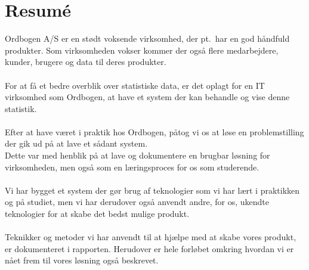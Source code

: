 \section{Resumé}
Ordbogen A/S er en stødt voksende virksomhed, der pt.\ har en god håndfuld produkter. Som virksomheden vokser kommer der også flere medarbejdere, kunder, brugere og data til deres produkter.
\\\\
For at få et bedre overblik over statistiske data, er det oplagt for en IT virksomhed som Ordbogen, at have et system der kan behandle og vise denne statistik.
\\\\
Efter at have været i praktik hos Ordbogen, påtog vi os at løse en problemstilling der gik ud på at lave et sådant system.
\\
Dette var med henblik på at lave og dokumentere en brugbar løsning for virksomheden, men også som en læringsproces for os som studerende.
\\\\
Vi har bygget et system der gør brug af teknologier som vi har lært i praktikken og på studiet, men vi har derudover også anvendt andre, for os, ukendte teknologier for at skabe det bedst mulige produkt.
\\\\
Teknikker og metoder vi har anvendt til at hjælpe med at skabe vores produkt, er dokumenteret i rapporten. Herudover er hele forløbet omkring hvordan vi er nået frem til vores løsning også beskrevet.
